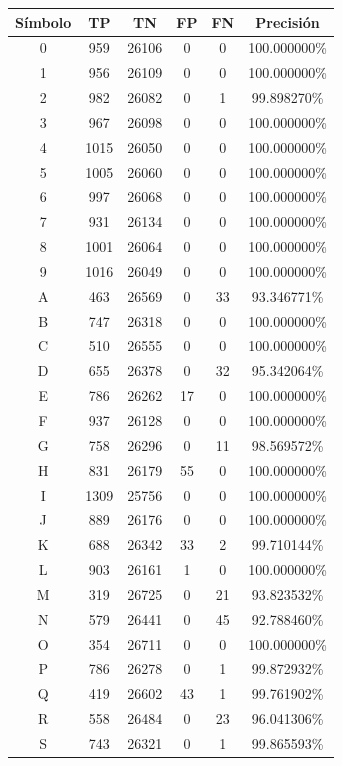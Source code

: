 \documentclass[a4paper, 11pt, oneside]{report}
\begin{document}
\begin{table}
\centering
\begin{tabular}{|c|c|c|c|c|c|}
\hline
Símbolo & TP & TN & FP & FN & Precisión \\ 
\hline
0 & 959 & 26106 & 0 & 0 & 100.000000\% \\ 
1 & 956 & 26109 & 0 & 0 & 100.000000\% \\ 
2 & 982 & 26082 & 0 & 1 & 99.898270\% \\ 
3 & 967 & 26098 & 0 & 0 & 100.000000\% \\ 
4 & 1015 & 26050 & 0 & 0 & 100.000000\% \\ 
5 & 1005 & 26060 & 0 & 0 & 100.000000\% \\ 
6 & 997 & 26068 & 0 & 0 & 100.000000\% \\ 
7 & 931 & 26134 & 0 & 0 & 100.000000\% \\ 
8 & 1001 & 26064 & 0 & 0 & 100.000000\% \\ 
9 & 1016 & 26049 & 0 & 0 & 100.000000\% \\ 
A & 463 & 26569 & 0 & 33 & 93.346771\% \\ 
B & 747 & 26318 & 0 & 0 & 100.000000\% \\ 
C & 510 & 26555 & 0 & 0 & 100.000000\% \\ 
D & 655 & 26378 & 0 & 32 & 95.342064\% \\ 
E & 786 & 26262 & 17 & 0 & 100.000000\% \\ 
F & 937 & 26128 & 0 & 0 & 100.000000\% \\ 
G & 758 & 26296 & 0 & 11 & 98.569572\% \\ 
H & 831 & 26179 & 55 & 0 & 100.000000\% \\ 
I & 1309 & 25756 & 0 & 0 & 100.000000\% \\ 
J & 889 & 26176 & 0 & 0 & 100.000000\% \\ 
K & 688 & 26342 & 33 & 2 & 99.710144\% \\ 
L & 903 & 26161 & 1 & 0 & 100.000000\% \\ 
M & 319 & 26725 & 0 & 21 & 93.823532\% \\ 
N & 579 & 26441 & 0 & 45 & 92.788460\% \\ 
O & 354 & 26711 & 0 & 0 & 100.000000\% \\ 
P & 786 & 26278 & 0 & 1 & 99.872932\% \\ 
Q & 419 & 26602 & 43 & 1 & 99.761902\% \\ 
R & 558 & 26484 & 0 & 23 & 96.041306\% \\ 
S & 743 & 26321 & 0 & 1 & 99.865593\% \\ 

\end{tabular}
\end{table}
\end{document}
